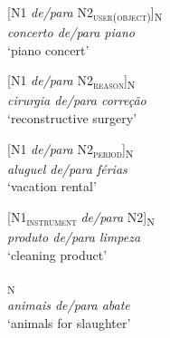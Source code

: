\documentclass[output=paper]{langsci/langscibook}
\begin{document}
\begin{exe}\ex\begin{minipage}[t]{0.4\textwidth}    %
[N1 \textit{de/para} N2\textsubscript{\scshape user(object)}]\textsubscript{N}\\
\textit{concerto de/para piano}\\
`piano concert'
\end{minipage}\hfill%
\begin{minipage}[t]{0.45\textwidth}
[N1 \textit{de/para} N2\textsubscript{\scshape reason}]\textsubscript{N}\\
\textit{cirurgia de/para correção}\\
`reconstructive surgery'
\end{minipage}
\end{exe}

\begin{exe}\ex\begin{minipage}[t]{0.4\textwidth}
[N1 \textit{de/para} N2\textsubscript{\scshape period}]\textsubscript{N}\\
\textit{aluguel de/para férias}\\
`vacation rental'
\end{minipage}\hfill\begin{minipage}[t]{0.45\textwidth}
[N1\textsubscript{\scshape instrument} \textit{de/para} N2]\textsubscript{N}\\
\textit{produto de/para limpeza}\\
`cleaning product'
\end{minipage}\end{exe}

\ea{}\textsubscript{N}\\
\textit{animais de/para abate}\\
`animals for slaughter'
\z
\end{document}
